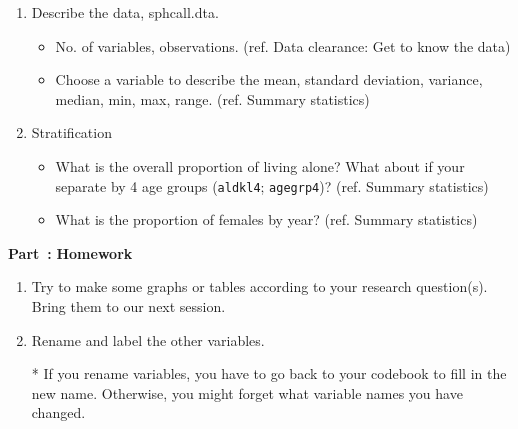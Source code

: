 \documentclass[11pt]{article}
\newcounter{Part}[section]
\newenvironment{Part}[1][]{\refstepcounter{Part}\par\medskip
   \noindent \large \textbf{Part~\thePart #1: }}{\medskip}
\begin{document}
\begin{enumerate}
    \item Describe the data, sphc\textunderscore all.dta.
    \begin{itemize}
    \item No. of variables, observations. (ref. Data clearance: Get to know the data)
    \item Choose a variable to describe the mean, standard deviation, variance, median, min, max, range. (ref. Summary statistics)

    \end{itemize}

    \item Stratification
    \begin{itemize}
    \item What is the overall proportion of living alone? What about if your separate by 4 age groups (\verb|aldkl4|; \verb|agegrp4|)?	(ref. Summary statistics)
    \item What is the proportion of females by year? (ref. Summary statistics)
    \end{itemize}

\end{enumerate}

\begin{Part}
\textbf{Homework}
\end{Part}

\begin{enumerate}
    \item Try to make some graphs or tables according to your research question(s). Bring them to our next session.
    \item Rename and label the other variables.
    \item[*] If you rename variables, you have to go back to your codebook to fill in the new name. Otherwise, you might forget what variable names you have changed.
   
\end{enumerate}
\end{document}
